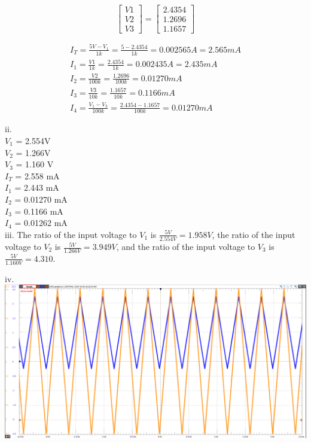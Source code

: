 \documentclass[12pt]{article}
\begin{document}
\[
\begin{bmatrix}
    V1 \\
    V2 \\
    V3
\end{bmatrix}
=
\begin{bmatrix}
    2.4354 \\
    1.2696 \\
    1.1657
\end{bmatrix}
\]

\begin{gather*}
I_T = \frac{5V-V_1}{1k} = \frac{5-2.4354}{1k} = 0.002565A = 2.565mA \\
I_1 = \frac{V1}{1k} = \frac{2.4354}{1k} = 0.002435A = 2.435mA \\
I_2 = \frac{V2}{100k} = \frac{1.2696}{100k} = 0.01270mA \\
I_3 = \frac{V3}{10k} = \frac{1.1657}{10k} = 0.1166mA \\
I_4 = \frac{V_1-V_3}{100k} = \frac{2.4354-1.1657}{100k} = 0.01270mA 
\end{gather*}

ii. \\
$V_1$ = 2.554V \\
$V_2$ = 1.266V \\
$V_3$ = 1.160 V \\
$I_T$ = 2.558 mA \\
$I_1$ = 2.443 mA \\
$I_2$ = 0.01270 mA \\
$I_3$ = 0.1166 mA \\
$I_4$ = 0.01262 mA \\

iii. The ratio of the input voltage to $V_1$ is $\frac{5V}{2.554V} = 1.958V$, the ratio of the input voltage to $V_2$ is $\frac{5V}{1.266V} = 3.949V$, and the ratio of the input voltage to $V_3$ is $\frac{5V}{1.160V} = 4.310$. \\

\newpage

iv. \\
\includegraphics[width=\textwidth]{Q4.png} \\
\end{document}
